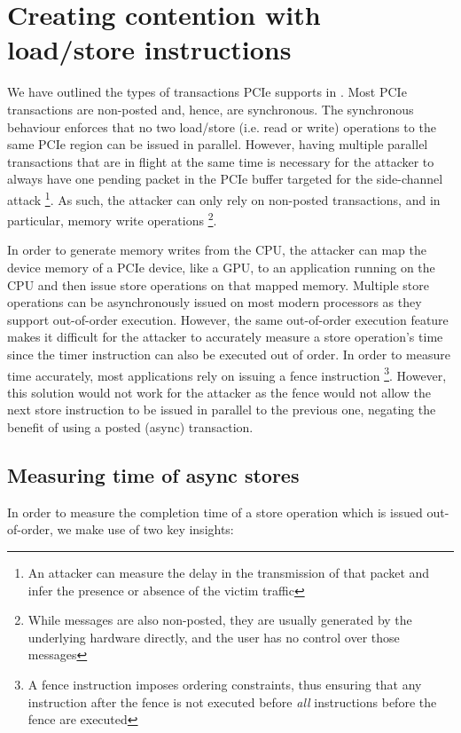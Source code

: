 \section{Creating contention with load/store instructions}
\label{sec:contention-with-stores}

We have outlined the types of transactions PCIe supports in .
Most PCIe transactions are non-posted and, hence, are synchronous.
The synchronous behaviour enforces that no two load/store (i.e. read or write) operations to the same PCIe region can be issued in parallel.
However, having multiple parallel transactions that are in flight at the same time is necessary for the attacker to always have one pending packet in the PCIe buffer targeted for the side-channel attack
\footnote{An attacker can measure the delay in the transmission of that packet and infer the presence or absence of the victim traffic}.
As such, the attacker can only rely on non-posted transactions, and in particular, memory write operations
\footnote{While messages are also non-posted, they are usually generated by the underlying hardware directly, and the user has no control over those messages}.

In order to generate memory writes from the CPU, the attacker can map the device memory of a PCIe device, like a GPU, to an application running on the CPU and then issue store operations on that mapped memory.
Multiple store operations can be asynchronously issued on most modern processors as they support out-of-order execution. 
However, the same out-of-order execution feature makes it difficult for the attacker to accurately measure a store operation's time since the timer instruction can also be executed out of order.
In order to measure time accurately, most applications rely on issuing a fence instruction
\footnote{A fence instruction imposes ordering constraints, thus ensuring that any instruction after the fence is not executed before \textit{all} instructions before the fence are executed}.
However, this solution would not work for the attacker as the fence would not allow the next store instruction to be issued in parallel to the previous one, negating the benefit of using a posted (async) transaction.


\subsection{Measuring time of async stores}
\label{subsec:async_store_time}

In order to measure the completion time of a store operation which is issued out-of-order, we make use of two key insights:

